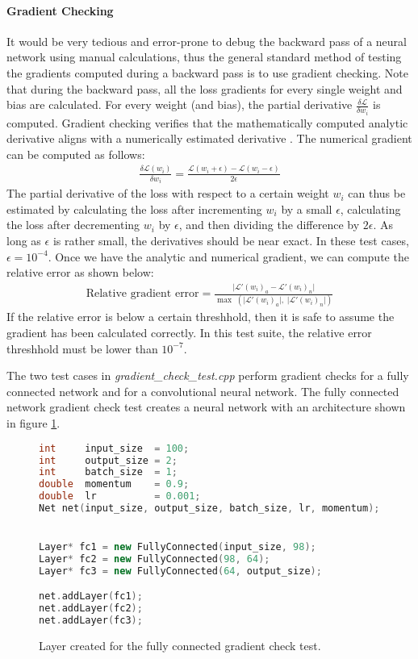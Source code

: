 \paragraph{Gradient Checking}
It would be very tedious and error-prone to debug the backward pass of a neural network using manual calculations, thus the general standard method of testing the gradients computed during a backward pass is to use gradient checking. Note that during the backward pass, all the loss gradients for every single weight and bias are calculated. For every weight (and bias), the partial derivative $\frac{\delta \mathcal{L}}{\delta w_i}$ is computed. Gradient checking verifies that the mathematically computed analytic derivative aligns with a numerically estimated derivative \cite{grad-check-stanford}. The numerical gradient can be computed as follows:
\begin{align*}
	\frac{\delta \mathcal{L}(w_i)}{\delta w_i} = \frac{\mathcal{L}(w_i + \epsilon) - \mathcal{L}(w_i - \epsilon)}{2\epsilon}
\end{align*}
The partial derivative of the loss with respect to a certain weight $w_i$ can thus be estimated by calculating the loss after incrementing $w_i$ by a small $\epsilon$, calculating the loss after decrementing $w_i$ by $\epsilon$, and then dividing the difference by $2\epsilon$. As long as $\epsilon$ is rather small, the derivatives should be near exact. In these test cases, $\epsilon = 10^{-4}$. Once we have the analytic and numerical gradient, we can compute the relative error as shown below:
\begin{align*}
	\text{Relative gradient error} = \frac{\lvert\mathcal{L}'(w_i)_a - \mathcal{L}'(w_i)_n\rvert}
		{\max \;\left(\lvert\mathcal{L}'(w_i)_a\rvert,\; \lvert\mathcal{L}'(w_i)_n\rvert\right)}
\end{align*}
If the relative error is below a certain threshhold, then it is safe to assume the gradient has been calculated correctly. In this test suite, the relative error threshhold must be lower than $10^{-7}$.
\par 
The two test cases in \textit{gradient\_check\_test.cpp} perform gradient checks for a fully connected network and for a convolutional neural network. The fully connected network gradient check test creates a neural network with an architecture shown in figure \ref{fctest}.
\begin{figure}
	\begin{lstlisting}[language=C++]
int 	input_size  = 100;
int 	output_size = 2;
int 	batch_size  = 1;
double 	momentum    = 0.9;
double 	lr          = 0.001; 
Net net(input_size, output_size, batch_size, lr, momentum);


Layer* fc1 = new FullyConnected(input_size, 98);
Layer* fc2 = new FullyConnected(98, 64);
Layer* fc3 = new FullyConnected(64, output_size);

net.addLayer(fc1);
net.addLayer(fc2);
net.addLayer(fc3);		
	\end{lstlisting}
	\caption{Layer created for the fully connected gradient check test.}
	\label{fctest}
\end{figure}
